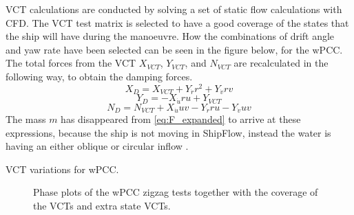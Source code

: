 VCT calculations are conducted by solving a set of static flow calculations with CFD. The VCT test matrix is selected to have a good coverage of the states that the ship will have during the manoeuvre. How the combinations of drift angle and yaw rate have been selected can be seen in the figure below, for the wPCC. 
The total forces from the VCT $X_{VCT}$, $Y_{VCT}$, and $N_{VCT}$ are recalculated in the following way, to obtain the damping forces.
\begin{equation}
    \label{eq:X_D}
    X_{D} = X_{VCT} + Y_{\dot{r}} r^{2} + Y_{\dot{v}} r v
\end{equation}
\begin{equation}
    \label{eq:Y_D}
    Y_{D} = - X_{\dot{u}} r u + Y_{VCT}
\end{equation}
\begin{equation}
    \label{eq:N_D}
    N_{D} = N_{VCT} + X_{\dot{u}} u v - Y_{\dot{r}} r u - Y_{\dot{v}} u v
\end{equation}
The mass $m$ has disappeared from \autoref{eq:F_expanded} to arrive at these expressions, because the ship is not moving in ShipFlow, instead the water is having an either oblique or circular inflow \citep{roychoudhuryCFDSimulationsSteady2017}.
\begin{table}[h]
    \centering
    \small
    \caption{VCT variations for wPCC.}
    \label{tab:inflow_to_rudder_force}
\end{table}
\begin{figure}[h]
    
    \caption{Phase plots of the wPCC zigzag tests together with the coverage of the VCTs and extra state VCTs.}
    \label{fig:VCT_phase_plot_wPCC}
\end{figure}

